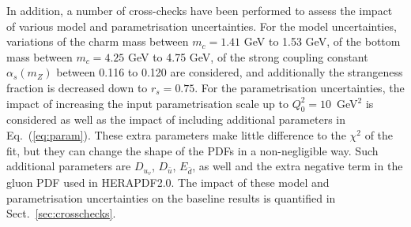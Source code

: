 In addition, a number of cross-checks have been performed to assess the
impact of various model and parametrisation uncertainties.
%
For the model uncertainties, variations of the charm mass
between $m_c=1.41$ GeV to 1.53 GeV, of the bottom mass between
$m_c=4.25$ GeV to 4.75 GeV, of the strong coupling constant
$\alpha_s(m_Z)$ between 0.116 to 0.120 are considered, and additionally the
strangeness fraction is decreased down to $r_s=0.75$.
%
For the parametrisation uncertainties, the impact
of increasing the input parametrisation scale up to $Q_0^2=10$~GeV$^2$ is considered as well as the impact of including additional parameters in Eq.~(\ref{eq:param}).
%
These extra parameters
make little difference to the $\chi^2$ of the fit, but they can
change the shape of the PDFs in a non-negligible way.
%
Such additional parameters are  $D_{u_v}$, $D_{\bar{u}}$, $E_{\bar{d}}$, as well
and the extra negative term  in the gluon PDF used in HERAPDF2.0.
%
The impact of these model and parametrisation uncertainties on the baseline results
is quantified in Sect.~\ref{sec:crosschecks}.
